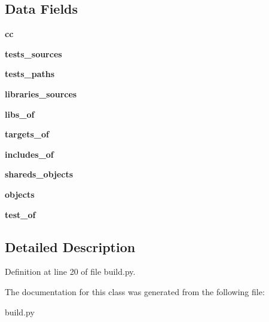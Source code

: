 \subsection*{\-Data \-Fields}
\begin{DoxyCompactItemize}
\item 
\hypertarget{classbuild_1_1InputPlugins_a5477b89f1bfbc5374c1650ada9fbaa87}{{\bfseries cc}}\label{classbuild_1_1InputPlugins_a5477b89f1bfbc5374c1650ada9fbaa87}

\item 
\hypertarget{classbuild_1_1InputPlugins_a8369fde13604b036acddc44709b14c5b}{{\bfseries tests\-\_\-sources}}\label{classbuild_1_1InputPlugins_a8369fde13604b036acddc44709b14c5b}

\item 
\hypertarget{classbuild_1_1InputPlugins_a2d932f4fb1790b42b90d213428072e71}{{\bfseries tests\-\_\-paths}}\label{classbuild_1_1InputPlugins_a2d932f4fb1790b42b90d213428072e71}

\item 
\hypertarget{classbuild_1_1InputPlugins_ab4434d33f230cabd0225e32a4b7140e2}{{\bfseries libraries\-\_\-sources}}\label{classbuild_1_1InputPlugins_ab4434d33f230cabd0225e32a4b7140e2}

\item 
\hypertarget{classbuild_1_1InputPlugins_a7441b4969f45a5589d7516237fdf3e89}{{\bfseries libs\-\_\-of}}\label{classbuild_1_1InputPlugins_a7441b4969f45a5589d7516237fdf3e89}

\item 
\hypertarget{classbuild_1_1InputPlugins_a9c95f75752e9148a678a3740cdefca07}{{\bfseries targets\-\_\-of}}\label{classbuild_1_1InputPlugins_a9c95f75752e9148a678a3740cdefca07}

\item 
\hypertarget{classbuild_1_1InputPlugins_aaf27f280f19ba39aaa22d6f4201d2614}{{\bfseries includes\-\_\-of}}\label{classbuild_1_1InputPlugins_aaf27f280f19ba39aaa22d6f4201d2614}

\item 
\hypertarget{classbuild_1_1InputPlugins_a2deef051b57ce38320ef2b5455b1b3a4}{{\bfseries shareds\-\_\-objects}}\label{classbuild_1_1InputPlugins_a2deef051b57ce38320ef2b5455b1b3a4}

\item 
\hypertarget{classbuild_1_1InputPlugins_ac1fce4852aafa244b7ca381be642b53d}{{\bfseries objects}}\label{classbuild_1_1InputPlugins_ac1fce4852aafa244b7ca381be642b53d}

\item 
\hypertarget{classbuild_1_1InputPlugins_a0f27efdc313720e58303ff1bd5161e01}{{\bfseries test\-\_\-of}}\label{classbuild_1_1InputPlugins_a0f27efdc313720e58303ff1bd5161e01}

\end{DoxyCompactItemize}


\subsection{\-Detailed \-Description}


\-Definition at line 20 of file build.\-py.



\-The documentation for this class was generated from the following file\-:\begin{DoxyCompactItemize}
\item 
build.\-py\end{DoxyCompactItemize}
